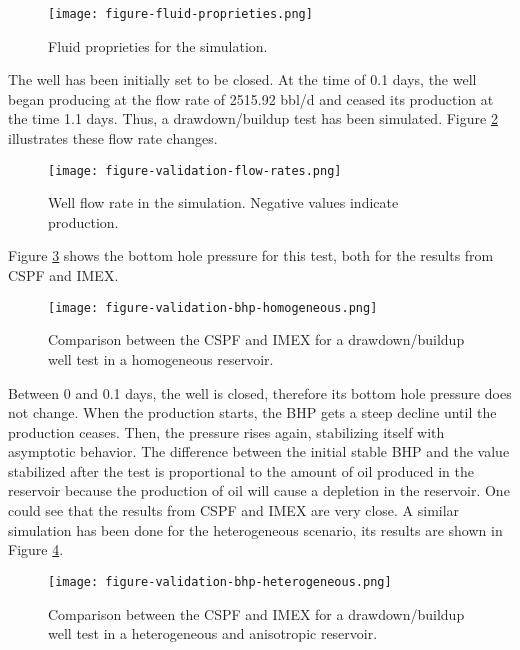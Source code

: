 \begin{figure}[H]
	\centering
	\texttt{[image: figure-fluid-proprieties.png]}
	\caption{Fluid proprieties for the simulation.}
	\label{figure-fluid-proprieties}
\end{figure}

The well has been initially set to be closed.
%
At the time of 0.1 days, the well began producing at the flow rate of 2515.92 bbl/d and ceased its production at the time 1.1 days.
%
Thus, a drawdown/buildup test has been simulated.
%
Figure \ref{figure-validation-flow-rates} illustrates these flow rate changes.

\begin{figure}[H]
	\centering
	\texttt{[image: figure-validation-flow-rates.png]}
	\caption{Well flow rate in the simulation. Negative values indicate production.}
	\label{figure-validation-flow-rates}
\end{figure}

Figure \ref{figure-validation-bhp-homogeneous} shows the bottom hole pressure for this test, both for the results from CSPF and IMEX.

\begin{figure}[H]
	\centering
	\texttt{[image: figure-validation-bhp-homogeneous.png]}
	\caption{Comparison between the CSPF and IMEX for a drawdown/buildup well test in a homogeneous reservoir.}
	\label{figure-validation-bhp-homogeneous}
\end{figure}

Between 0 and 0.1 days, the well is closed, therefore its bottom hole pressure does not change.
%
When the production starts, the BHP gets a steep decline until the production ceases.
%
Then, the pressure rises again, stabilizing itself with asymptotic behavior.
%
The difference between the initial stable BHP and the value stabilized after the test is proportional to the amount of oil produced in the reservoir because the production of oil will cause a depletion in the reservoir.
%
One could see that the results from CSPF and IMEX are very close.
%
A similar simulation has been done for the heterogeneous scenario, its results are shown in Figure \ref{figure-validation-bhp-heterogeneous}.

\begin{figure}[H]
	\centering
	\texttt{[image: figure-validation-bhp-heterogeneous.png]}
	\caption{Comparison between the CSPF and IMEX for a drawdown/buildup well test in a heterogeneous and anisotropic reservoir.}
	\label{figure-validation-bhp-heterogeneous}
\end{figure}

